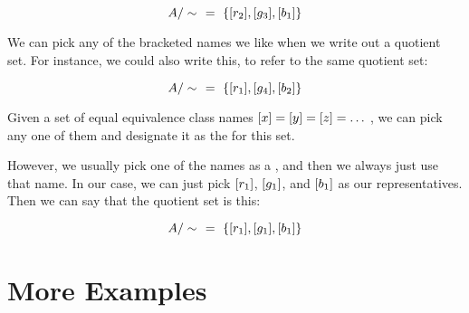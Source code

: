 \documentclass[../../../main.tex]{subfiles}
\begin{document}
\begin{equation*}
  \quotientset{\set{A}}{\equivalence/}~~=~
    \{ \equivclass{r_{2}}, \equivclass{g_{3}}, \equivclass{b_{1}} \}
\end{equation*}

We can pick any of the bracketed names we like when we write out a quotient set. For instance, we could also write this, to refer to the same quotient set:

\begin{equation*}
  \quotientset{\set{A}}{\equivalence/}~~=~
    \{ \equivclass{r_{1}}, \equivclass{g_{4}}, \equivclass{b_{2}} \}
\end{equation*}

\begin{terminology}
  Given a set of equal equivalence class names $[x] = [y] = [z] = \ldots$ , we can pick any one of them and designate it as the  for this set.
\end{terminology}

However, we usually pick one of the names as a , and then we always just use that name. In our case, we can just pick $[r_{1}]$, $[g_{1}]$, and $[b_{1}]$ as our representatives. Then we can say that the quotient set is this:

\begin{equation*}
  \quotientset{\set{A}}{\equivalence/}~~=~
    \{ \equivclass{r_{1}}, \equivclass{g_{1}}, \equivclass{b_{1}} \}
\end{equation*}


\section{More Examples}
\end{document}
